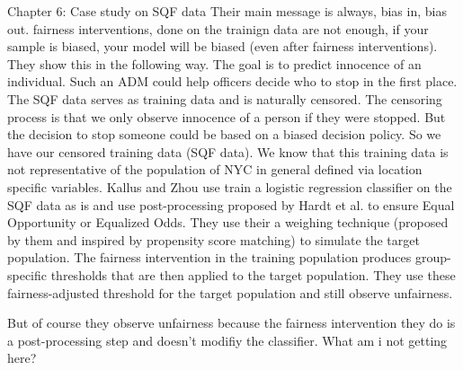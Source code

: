 Chapter 6: Case study on SQF data
Their main message is always, bias in, bias out. fairness interventions, done on the trainign data are not enough, if your sample is biased, your model will be biased (even after fairness interventions).
They show this in the following way. The goal is to predict innocence of an individual. Such an ADM could help officers
decide who to stop in the first place. The SQF data serves as training data and is naturally censored. The censoring process is that we only
observe innocence of a person if they were stopped. But the decision to stop someone could be based on a biased decision policy.
So we have our censored training data (SQF data). We know that this training data is not representative of the population of NYC in general defined via
location specific variables. Kallus and Zhou use train a logistic regression classifier on the SQF data as is and use post-processing proposed
by Hardt et al. to ensure Equal Opportunity or Equalized Odds. They use their a weighing technique (proposed by them and inspired by propensity score matching)
to simulate the target population. The fairness intervention in the training population produces group-specific thresholds that are then applied to the target population.
They use these fairness-adjusted threshold for the target population and still observe unfairness.

But of course they observe unfairness because the fairness intervention they do is a post-processing step and doesn't modifiy the classifier. What am i not getting here?